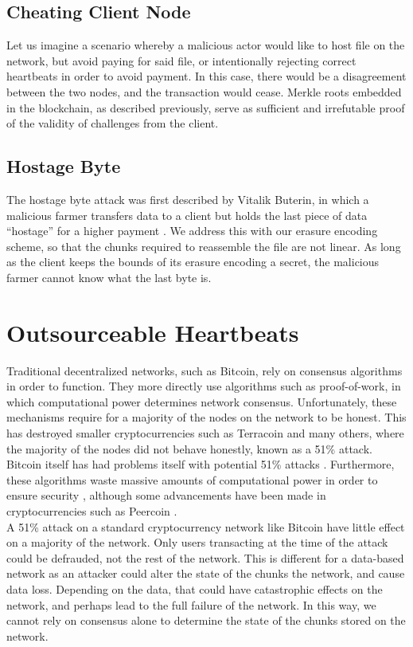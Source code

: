 \documentclass[a4paper,10pt]{article}
\begin{document}
\subsection{Cheating Client Node}
Let us imagine a scenario whereby a malicious actor would like to host file on the network, but avoid paying for said file, or intentionally rejecting correct heartbeats in order to avoid payment. In this case, there would be a disagreement between the two nodes, and the transaction would cease. Merkle roots embedded in the blockchain, as described previously, serve as sufficient and irrefutable proof of the validity of challenges from the client.

\subsection{Hostage Byte}
The hostage byte attack was first described by Vitalik Buterin, in which a malicious farmer transfers data to a client but holds the last piece of data “hostage” for a higher payment \cite{16}. We address this with our erasure encoding scheme, so that the chunks required to reassemble the file are not linear. As long as the client keeps the bounds of its erasure encoding a secret, the malicious farmer cannot know what the last byte is.   

\section{Outsourceable Heartbeats}
Traditional decentralized networks, such as Bitcoin, \cite{3} rely on consensus algorithms in order to function. They more directly use algorithms such as proof-of-work, \cite{3} in which computational power determines network consensus. Unfortunately, these mechanisms require for a majority of the nodes on the network to be honest. This has destroyed smaller cryptocurrencies such as Terracoin \cite{17} and many others, where the majority of the nodes did not behave honestly, known as a 51\% attack. Bitcoin itself has had problems itself with potential 51\% attacks \cite{18}.  Furthermore, these algorithms waste massive amounts of computational power in order to ensure security \cite{19}, although some advancements have been made in cryptocurrencies such as Peercoin \cite{19}.  \\

A 51\% attack on a standard cryptocurrency network like Bitcoin have little effect on a majority of the network. Only users transacting at the time of the attack could be defrauded, not the rest of the network. This is different for a data-based network as an attacker could alter the state of the chunks the network, and cause data loss. Depending on the data, that could have catastrophic effects on the network, and perhaps lead to the full failure of the network. In this way, we cannot rely on consensus alone to determine the state of the chunks stored on the network. \\
\end{document}
